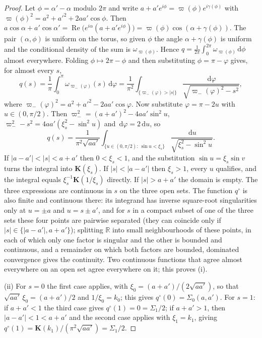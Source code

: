 \documentclass[preprint,12pt,a4paper]{elsarticle}
\theoremstyle{remark}
\newcommand{\R}{\mathbb R}
\newcommand{\dd}{\,\mathrm d}
\begin{document}
\begin{proof}
Let $\phi=\alpha'-\alpha$ modulo $2\pi$ and write
$a+a'e^{i\phi}=\varpi(\phi)e^{i\gamma(\phi)}$ with $\varpi(\phi)^2=a^2+a'^2+2aa'\cos\phi$.
Then $a\cos\alpha+a'\cos\alpha'=\operatorname{Re}\bigl(e^{i\alpha}(a+a'e^{i\phi})\bigr)
=\varpi(\phi)\cos(\alpha+\gamma(\phi))$. The pair $(\alpha,\phi)$ is uniform on the
torus, so given $\phi$ the angle $\alpha+\gamma(\phi)$ is uniform and the conditional
density of the sum is $\omega_{\varpi(\phi)}$. Hence $q=\frac1{2\pi}\int_0^{2\pi}\omega_{\varpi(\phi)}\dd\phi$
almost everywhere. Folding $\phi\mapsto2\pi-\phi$ and then substituting
$\phi=\pi-\varphi$ gives, for almost every $s$,
\[
 q(s)=\frac1\pi\int_0^\pi\omega_{\varpi_-(\varphi)}(s)\dd\varphi
 =\frac1{\pi^2}\int_{\{\varpi_-(\varphi)>|s|\}}\frac{\dd\varphi}{\sqrt{\varpi_-(\varphi)^2-s^2}},
\]
where $\varpi_-(\varphi)^2=a^2+a'^2-2aa'\cos\varphi$.
Now substitute $\varphi=\pi-2u$ with $u\in(0,\pi/2)$. Then
$\varpi_-^2=(a+a')^2-4aa'\sin^2u$, $\varpi_-^2-s^2=4aa'(\xi_s^2-\sin^2u)$ and $\dd\varphi=2\dd u$, so
\[
 q(s)=\frac1{\pi^2\sqrt{aa'}}\int_{\{u\in(0,\pi/2):\ \sin u<\xi_s\}}\frac{\dd u}{\sqrt{\xi_s^2-\sin^2u}} .
\]
If $|a-a'|<|s|<a+a'$ then $0<\xi_s<1$, and the substitution $\sin u=\xi_s\sin v$
turns the integral into $\mathbf K(\xi_s)$. If $|s|<|a-a'|$ then $\xi_s>1$, every $u$
qualifies, and the integral equals $\xi_s^{-1}\mathbf K(1/\xi_s)$ directly. If
$|s|>a+a'$ the domain is empty. The three expressions are continuous in $s$ on the
three open sets. The function $q^\circ$ is also finite and continuous there: its
integrand has inverse square-root singularities only at $u=\pm a$ and
$u=s\pm a'$, and for $s$ in a compact subset of one of the three sets these four points
are pairwise separated (they can coincide only if $|s|\in\{|a-a'|,a+a'\}$);
splitting $\R$ into small neighbourhoods of these points, in each of which only one
factor is singular and the other is bounded and continuous, and a remainder on which
both factors are bounded, dominated convergence gives the continuity. Two continuous
functions that agree almost everywhere on an open set agree everywhere on it;
this proves (i).

(ii) For $s=0$ the first case applies, with $\xi_0=(a+a')/(2\sqrt{aa'})$, so that
$\sqrt{aa'}\,\xi_0=(a+a')/2$ and $1/\xi_0=k_0$; this gives $q^\circ(0)=\Sigma_0(a,a')$.
For $s=1$: if $a+a'<1$ the third case gives $q^\circ(1)=0=\Sigma_1/2$; if $a+a'>1$,
then $|a-a'|<1<a+a'$ and the second case applies with $\xi_1=k_1$, giving
$q^\circ(1)=\mathbf K(k_1)/(\pi^2\sqrt{aa'})=\Sigma_1/2$.
\end{proof}
\end{document}
